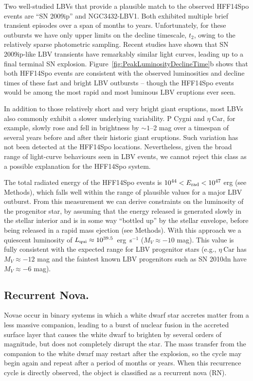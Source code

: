 \documentclass{article}
\def\etacar{\ensuremath{\eta~\mbox{Car}}\xspace}
\def\etaCar{\ensuremath{\eta~\mbox{Car}}\xspace}
\def\spock{HFF14Spo\xspace}
\begin{document}
Two well-studied LBVs that provide a plausible match to the observed
\spock events are ``SN 2009ip''\cite{Maza:2009, Pastorello:2013} and
NGC3432-LBV1\cite{Pastorello:2010}.  Both exhibited multiple brief
transient episodes over a span of months to years.  Unfortunately,
for these outbursts we have only upper limits on the decline
timescale, $t_2$, owing to the relatively sparse photometric sampling.
Recent studies have shown that SN 2009ip-like LBV transients have remarkably
similar light curves, leading up to a final terminal SN
explosion\cite{Kilpatrick:2017, Pastorello:2017}.
Figure~\ref{fig:PeakLuminosityDeclineTime}b shows that both \spock
events are consistent with the observed luminosities and decline times
of these fast and bright LBV outbursts -- though the \spock events
would be among the most rapid and most luminous LBV eruptions ever
seen.

In addition to those relatively short and very bright giant eruptions,
most LBVs also commonly exhibit a slower underlying variability. P
Cygni and \etaCar, for example, slowly rose and fell in brightness by
$\sim1$--2 mag over a timespan of several years before and after
their historic giant eruptions.  Such variation has not been detected
at the \spock locations. Nevertheless, given the broad
range of light-curve behaviours seen in LBV events, we cannot reject
this class as a possible explanation for the \spock system.

The total radiated energy of the \spock events is
$10^{44}<E_{\rm rad}<10^{47}$ erg (see Methods), which falls well
within the range of plausible values for a major LBV outburst.  From
this measurement we can derive constraints on the luminosity of the
progenitor star, by assuming that the energy released is generated
slowly in the stellar interior and is in some way ``bottled up'' by
the stellar envelope, before being released in a rapid mass ejection
(see Methods).  With this approach we a quiescent luminosity of
$L_{\rm qui}\approx10^{39.5}$~erg~s$^{-1}$ ($M_V\approx-10$ mag).  This value is
fully consistent with the expected range for LBV progenitor stars
(e.g., \etacar has $M_V\approx-12$ mag and the faintest known LBV progenitors
such as SN 2010dn have $M_V\approx-6$ mag).


\subsection{Recurrent Nova.}\label{sec:RNe}

Novae occur in binary systems in which a white dwarf star accretes
matter from a less massive companion, leading to a burst of nuclear
fusion in the accreted surface layer that causes the white dwarf to
brighten by several orders of magnitude, but does not completely
disrupt the star. The mass transfer from the companion to the white
dwarf may restart after the explosion, so the cycle may begin again
and repeat after a period of months or years.  When this recurrence
cycle is directly observed, the object is classified as a recurrent
nova (RN).
\end{document}
